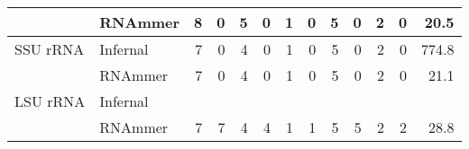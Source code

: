 \begin{footnotesize}
\begin{table}
\begin{center}
\begin{tabular}{|l|l|rr|rr|rr|rr|rr|r|}
                 &  RNAmmer          &    8 &   0 &    5 &   0 &    1 &   0 &    5 &   0 &    2 &   0 &  20.5  \\ \hline
SSU rRNA         &  Infernal         &    7 &   0 &    4 &   0 &    1 &   0 &    5 &   0 &    2 &   0 & 774.8  \\ 
                 &  RNAmmer          &    7 &   0 &    4 &   0 &    1 &   0 &    5 &   0 &    2 &   0 &  21.1  \\ \hline
LSU rRNA         &  Infernal         &      &     &      &     &      &     &      &     &      &     &        \\ 
                 &  RNAmmer          &    7 &   7 &    4 &   4 &    1 &   1 &    5 &   5 &    2 &   2 &  28.8  \\ \hline
\end{tabular}
\end{center}
\end{table}

\end{footnotesize}
